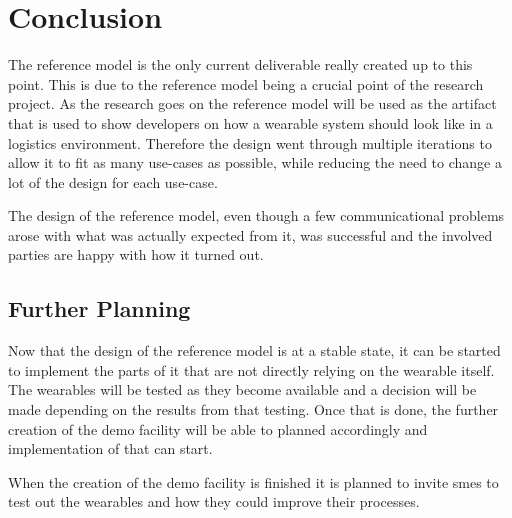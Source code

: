 \chapter{Conclusion}\label{cha:conclusion}
The reference model is the only current deliverable really created up to this point. This is due to the reference model being a crucial point of the research project. As the research goes on the reference model will be used as the artifact that is used to show developers on how a wearable system should look like in a logistics environment. Therefore the design went through multiple iterations to allow it to fit as many use-cases as possible, while reducing the need to change a lot of the design for each use-case.

The design of the reference model, even though a few communicational problems arose with what was actually expected from it, was successful and the involved parties are happy with how it turned out.

\section*{Further Planning}
Now that the design of the reference model is at a stable state, it can be started to implement the parts of it that are not directly relying on the wearable itself. The wearables will be tested as they become available and a decision will be made depending on the results from that testing. Once that is done, the further creation of the demo facility will be able to planned accordingly and implementation of that can start.

When the creation of the demo facility is finished it is planned to invite \gls{sme}s to test out the wearables and how they could improve their processes.